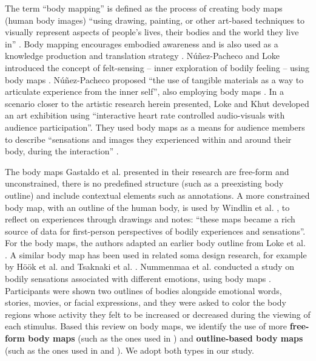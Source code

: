 The term “body mapping” is defined as the process of creating body maps (human body images) “using drawing, painting, or other art-based techniques to visually represent aspects of people's lives, their bodies and the world they live in” \cite{gastaldo_body-map_2012}. Body mapping encourages embodied awareness and is also used as a knowledge production and translation strategy \cite{de_jager_embodied_2016}. Núñez-Pacheco and Loke introduced the concept of felt-sensing -- inner exploration of bodily feeling -- using body maps \cite{nunez-pacheco_felt-sensing_2016}. Núñez-Pacheco proposed “the use of tangible materials as a way to articulate experience from the inner self”, also employing body maps \cite{nunez-pacheco_tangible_2021}. In a scenario closer to the artistic research herein presented, Loke and Khut \cite{loke_intimate_2014} developed an art exhibition using “interactive heart rate controlled audio-visuals with audience participation”. They used body maps as a means for audience members to describe “sensations and images they experienced within and around their body, during the interaction” \cite{loke_intimate_2014}.

The body maps Gastaldo et al. presented in their research are free-form and unconstrained, there is no predefined structure (such as a preexisting body outline) and include contextual elements such as annotations. A more constrained body map, with an outline of the human body, is used by Windlin et al. \cite{windlin_soma_2019}, to reflect on experiences through drawings and notes: “these maps became a rich source of data for first-person perspectives of bodily experiences and sensations”. For the body maps, the authors adapted an earlier body outline from Loke et al. \cite{loke_bodily_2012}. A similar body map has been used in related soma design research, for example by Höök et al. \cite{hook_soma_2019} and Tsaknaki et al. \cite{tsaknaki_teaching_2019}. Nummenmaa et al. conducted a study on bodily sensations associated with different emotions, using body maps \cite{nummenmaa_bodily_2014}. Participants were shown two outlines of bodies alongside emotional words, stories, movies, or facial expressions, and they were asked to color the body regions whose activity they felt to be increased or decreased during the viewing of each stimulus. Based this review on body maps, we identify the use of more \textbf{free-form body maps} (such as the ones used in \cite{gastaldo_body-map_2012}) and \textbf{outline-based body maps} (such as the ones used in \cite{windlin_soma_2019} and \cite{nummenmaa_bodily_2014}). We adopt both types in our study.

